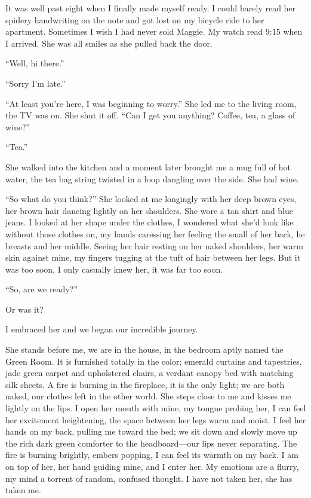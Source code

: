 \documentclass[
]{article}
\begin{document}
It was well past eight when I finally made myself ready. I could barely
read her spidery handwriting on the note and got lost on my bicycle ride
to her apartment. Sometimes I wish I had never sold Maggie. My watch
read 9:15 when I arrived. She was all smiles as she pulled back the
door.

``Well, hi there.''

``Sorry I'm late.''

``At least you're here, I was beginning to worry.'' She led me to the
living room, the TV was on. She shut it off. ``Can I get you anything?
Coffee, tea, a glass of wine?''

``Tea.''

She walked into the kitchen and a moment later brought me a mug full of
hot water, the tea bag string twisted in a loop dangling over the side.
She had wine.

``So what do you think?'' She looked at me longingly with her deep brown
eyes, her brown hair dancing lightly on her shoulders. She wore a tan
shirt and blue jeans. I looked at her shape under the clothes, I
wondered what she'd look like without those clothes on, my hands
caressing her feeling the small of her back, he breasts and her middle.
Seeing her hair resting on her naked shoulders, her warm skin against
mine, my fingers tugging at the tuft of hair between her legs. But it
was too soon, I only casually knew her, it was far too soon.

``So, are we ready?''

Or was it?

I embraced her and we began our incredible journey.

She stands before me, we are in the house, in the bedroom aptly named
the Green Room. It is furnished totally in the color; emerald curtains
and tapestries, jade green carpet and upholstered chairs, a verdant
canopy bed with matching silk sheets. A fire is burning in the
fireplace, it is the only light; we are both naked, our clothes left in
the other world. She steps close to me and kisses me lightly on the
lips. I open her mouth with mine, my tongue probing her, I can feel her
excitement heightening, the space between her legs warm and moist. I
feel her hands on my back, pulling me toward the bed; we sit down and
slowly move up the rich dark green comforter to the headboard---our lips
never separating. The fire is burning brightly, embers popping, I can
feel its warmth on my back. I am on top of her, her hand guiding mine,
and I enter her. My emotions are a flurry, my mind a torrent of random,
confused thought. I have not taken her, she has taken me.
\end{document}

